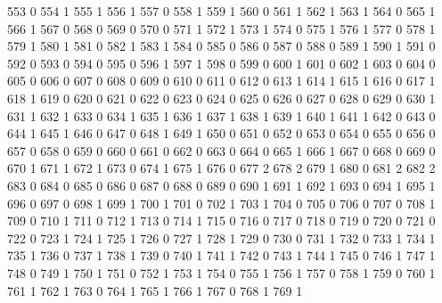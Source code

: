 \documentclass[compress,8pt]{beamer}
\begin{document}
\begin{frame}
\begin{Schunk}
  553     0
  554     1
  555     1
  556     1
  557     0
  558     1
  559     1
  560     0
  561     1
  562     1
  563     1
  564     0
  565     1
  566     1
  567     0
  568     0
  569     0
  570     0
  571     1
  572     1
  573     1
  574     0
  575     1
  576     1
  577     0
  578     1
  579     1
  580     1
  581     0
  582     1
  583     1
  584     0
  585     0
  586     0
  587     0
  588     0
  589     1
  590     1
  591     0
  592     0
  593     0
  594     0
  595     0
  596     1
  597     1
  598     0
  599     0
  600     1
  601     0
  602     1
  603     0
  604     0
  605     0
  606     0
  607     0
  608     0
  609     0
  610     0
  611     0
  612     0
  613     1
  614     1
  615     1
  616     0
  617     1
  618     1
  619     0
  620     0
  621     0
  622     0
  623     0
  624     0
  625     0
  626     0
  627     0
  628     0
  629     0
  630     1
  631     1
  632     1
  633     0
  634     1
  635     1
  636     1
  637     1
  638     1
  639     1
  640     1
  641     1
  642     0
  643     0
  644     1
  645     1
  646     0
  647     0
  648     1
  649     1
  650     0
  651     0
  652     0
  653     0
  654     0
  655     0
  656     0
  657     0
  658     0
  659     0
  660     0
  661     0
  662     0
  663     0
  664     0
  665     1
  666     1
  667     0
  668     0
  669     0
  670     1
  671     1
  672     1
  673     0
  674     1
  675     1
  676     0
  677     2
  678     2
  679     1
  680     0
  681     2
  682     2
  683     0
  684     0
  685     0
  686     0
  687     0
  688     0
  689     0
  690     1
  691     1
  692     1
  693     0
  694     1
  695     1
  696     0
  697     0
  698     1
  699     1
  700     1
  701     0
  702     1
  703     1
  704     0
  705     0
  706     0
  707     0
  708     1
  709     0
  710     1
  711     0
  712     1
  713     0
  714     1
  715     0
  716     0
  717     0
  718     0
  719     0
  720     0
  721     0
  722     0
  723     1
  724     1
  725     1
  726     0
  727     1
  728     1
  729     0
  730     0
  731     1
  732     0
  733     1
  734     1
  735     1
  736     0
  737     1
  738     1
  739     0
  740     1
  741     1
  742     0
  743     1
  744     1
  745     0
  746     1
  747     1
  748     0
  749     1
  750     1
  751     0
  752     1
  753     1
  754     0
  755     1
  756     1
  757     0
  758     1
  759     0
  760     1
  761     1
  762     1
  763     0
  764     1
  765     1
  766     1
  767     0
  768     1
  769     1

\end{Schunk}
\end{frame}
\end{document}

